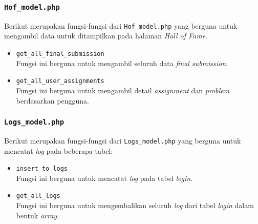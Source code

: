\subsubsection{\texttt{Hof\_model.php}}
Berikut merupakan fungsi-fungsi dari \texttt{Hof\_model.php} yang berguna untuk mengambil data untuk ditampilkan pada halaman \textit{Hall of Fame}.
\begin{itemize}
	\item \texttt{get\_all\_final\_submission}\\
	Fungsi ini berguna untuk mengambil seluruh data \textit{final submission}.
	\item \texttt{get\_all\_user\_assignments}\\
	Fungsi ini berguna untuk mengambil detail \textit{assignment} dan \textit{problem} berdasarkan pengguna.
\end{itemize}
\subsubsection{\texttt{Logs\_model.php}}
Berikut merupakan fungsi-fungsi dari \texttt{Logs\_model.php} yang berguna untuk mencatat \textit{log} pada beberapa tabel:
\begin{itemize}
	\item \texttt{insert\_to\_logs}\\
	Fungsi ini berguna untuk mencatat \textit{log} pada tabel \textit{login}.
	\item \texttt{get\_all\_logs}\\
	Fungsi ini berguna untuk mengembalikan seluruh \textit{log} dari tabel \textit{login} dalam bentuk \textit{array}.
\end{itemize}
